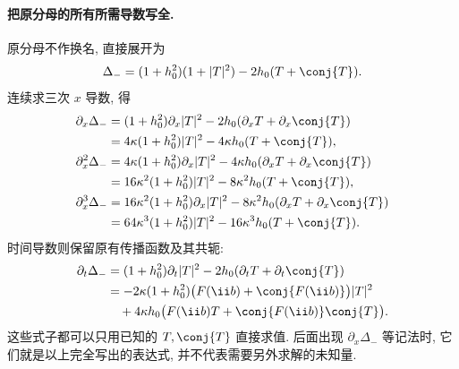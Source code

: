 \paragraph{把原分母的所有所需导数写全.}
原分母不作换名, 直接展开为
\[
\Delta_-=(1+h_0^2)(1+|T|^2)-2h_0(T+\conj{T}).
\]
连续求三次 $x$ 导数, 得
\begin{align*}
\partial_x\Delta_-
&=(1+h_0^2)\partial_x|T|^2
-2h_0(\partial_xT+\partial_x\conj{T})\\
&=4\kappa(1+h_0^2)|T|^2
-4\kappa h_0(T+\conj{T}),\\
\partial_x^2\Delta_-
&=4\kappa(1+h_0^2)\partial_x|T|^2
-4\kappa h_0(\partial_xT+\partial_x\conj{T})\\
&=16\kappa^2(1+h_0^2)|T|^2
-8\kappa^2h_0(T+\conj{T}),\\
\partial_x^3\Delta_-
&=16\kappa^2(1+h_0^2)\partial_x|T|^2
-8\kappa^2h_0(\partial_xT+\partial_x\conj{T})\\
&=64\kappa^3(1+h_0^2)|T|^2
-16\kappa^3h_0(T+\conj{T}).
\end{align*}
时间导数则保留原有传播函数及其共轭:
\begin{align*}
\partial_t\Delta_-
&=(1+h_0^2)\partial_t|T|^2
-2h_0(\partial_tT+\partial_t\conj{T})\\
&=-2\kappa(1+h_0^2)
\bigl(F(\ii b)+\conj{F(\ii b)}\bigr)|T|^2\\
&\quad+4\kappa h_0
\bigl(F(\ii b)T+\conj{F(\ii b)}\conj{T}\bigr).
\end{align*}
这些式子都可以只用已知的 $T,\conj{T}$ 直接求值. 后面出现 $\partial_x\Delta_-$ 等记法时, 它们就是以上完全写出的表达式, 并不代表需要另外求解的未知量.

